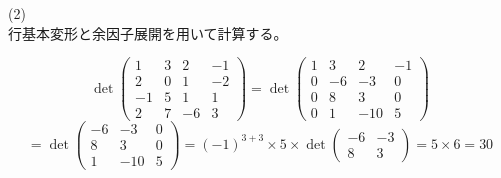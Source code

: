 \documentclass{jlreq}
\begin{document}
\begin{problem}
  (2) \\
  行基本変形と余因子展開を用いて計算する。
  
  \begin{equation*}
    \det \begin{pmatrix}
      1 & 3 & 2 & -1 \\
      2 & 0 & 1 & -2 \\
      -1 & 5 & 1 & 1 \\
      2 & 7 & -6 & 3
    \end{pmatrix} = \det \begin{pmatrix}
      1 & 3 & 2 & -1 \\
      0 & -6 & -3 & 0 \\
      0 & 8 & 3 & 0 \\
      0 & 1 & -10 & 5
    \end{pmatrix}
  \end{equation*}
  \begin{equation*}
    = \det \begin{pmatrix}
      -6 & -3 & 0 \\
      8 & 3 & 0 \\
      1 & -10 & 5
    \end{pmatrix} = (-1) ^ {3 + 3} \times 5 \times \det \begin{pmatrix}
      -6 & -3 \\
      8 & 3
    \end{pmatrix} = 5 \times 6 = 30
  \end{equation*}
\end{problem}
\end{document}
